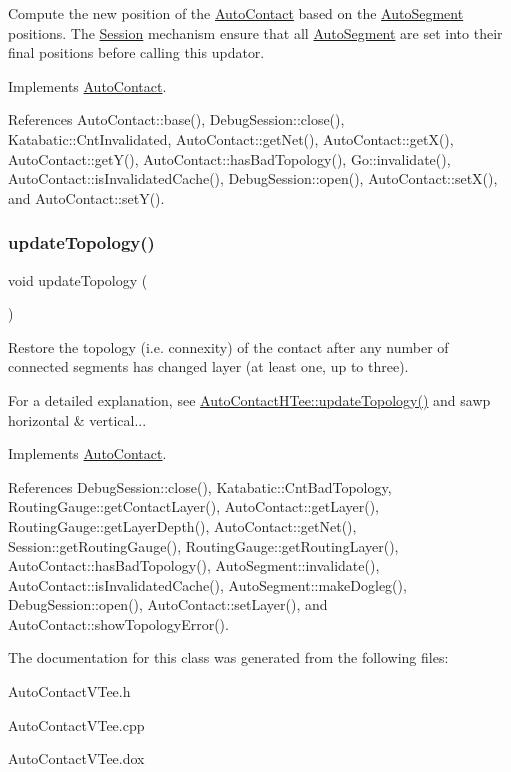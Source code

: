 Compute the new position of the \hyperlink{classKatabatic_1_1AutoContact}{Auto\+Contact} based on the \hyperlink{classKatabatic_1_1AutoSegment}{Auto\+Segment} positions. The \hyperlink{classKatabatic_1_1Session}{Session} mechanism ensure that all \hyperlink{classKatabatic_1_1AutoSegment}{Auto\+Segment} are set into their final positions before calling this updator. 

Implements \hyperlink{classKatabatic_1_1AutoContact_af6a2454547eeb7f5a519970dcb467e90}{Auto\+Contact}.



References Auto\+Contact\+::base(), Debug\+Session\+::close(), Katabatic\+::\+Cnt\+Invalidated, Auto\+Contact\+::get\+Net(), Auto\+Contact\+::get\+X(), Auto\+Contact\+::get\+Y(), Auto\+Contact\+::has\+Bad\+Topology(), Go\+::invalidate(), Auto\+Contact\+::is\+Invalidated\+Cache(), Debug\+Session\+::open(), Auto\+Contact\+::set\+X(), and Auto\+Contact\+::set\+Y().

\mbox{\label{classKatabatic_1_1AutoContactVTee_af5bf1f5e71204ef84346e4e036175431}} 
\subsubsection{\texorpdfstring{update\+Topology()}{updateTopology()}}
{\footnotesize\ttfamily void update\+Topology (\begin{DoxyParamCaption}{ }\end{DoxyParamCaption})\hspace{0.3cm}{\ttfamily [virtual]}}

Restore the topology (i.\+e. connexity) of the contact after any number of connected segments has changed layer (at least one, up to three).

For a detailed explanation, see \hyperlink{classKatabatic_1_1AutoContactHTee_af5bf1f5e71204ef84346e4e036175431}{Auto\+Contact\+H\+Tee\+::update\+Topology()} and sawp horizontal \& vertical... 

Implements \hyperlink{classKatabatic_1_1AutoContact_a690764ddc997fe9766a79c4b8e0c3e2f}{Auto\+Contact}.



References Debug\+Session\+::close(), Katabatic\+::\+Cnt\+Bad\+Topology, Routing\+Gauge\+::get\+Contact\+Layer(), Auto\+Contact\+::get\+Layer(), Routing\+Gauge\+::get\+Layer\+Depth(), Auto\+Contact\+::get\+Net(), Session\+::get\+Routing\+Gauge(), Routing\+Gauge\+::get\+Routing\+Layer(), Auto\+Contact\+::has\+Bad\+Topology(), Auto\+Segment\+::invalidate(), Auto\+Contact\+::is\+Invalidated\+Cache(), Auto\+Segment\+::make\+Dogleg(), Debug\+Session\+::open(), Auto\+Contact\+::set\+Layer(), and Auto\+Contact\+::show\+Topology\+Error().



The documentation for this class was generated from the following files\+:\begin{DoxyCompactItemize}
\item 
Auto\+Contact\+V\+Tee.\+h\item 
Auto\+Contact\+V\+Tee.\+cpp\item 
Auto\+Contact\+V\+Tee.\+dox\end{DoxyCompactItemize}
